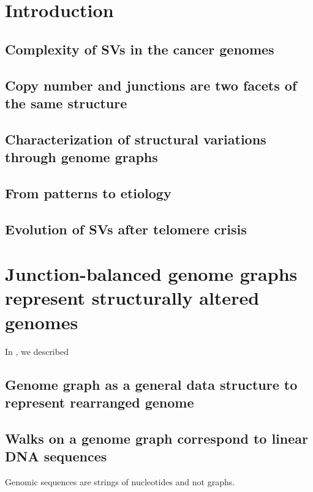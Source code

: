 \documentclass[phd,tocprelim]{cornell}
\begin{document}
\symlist

\normalspacing \setcounter{page}{1} 
\pagestyle{cornell} \addtolength{\parskip}{0.5\baselineskip}

\chapter{Introduction}
\section{Complexity of SVs in the cancer genomes}
\section{Copy number and junctions are two facets of the same structure}
\section{Characterization of structural variations through genome graphs}
\section{From patterns to etiology}
\section{Evolution of SVs after telomere crisis}

\chapter{Junction-balanced genome graphs represent structurally altered genomes}
In \cite{Hadi2020-um}, we described

\section{Genome graph as a general data structure to represent rearranged genome}
\section{Walks on a genome graph correspond to linear DNA sequences}
Genomic sequences are strings of nucleotides and not graphs.
\end{document}
